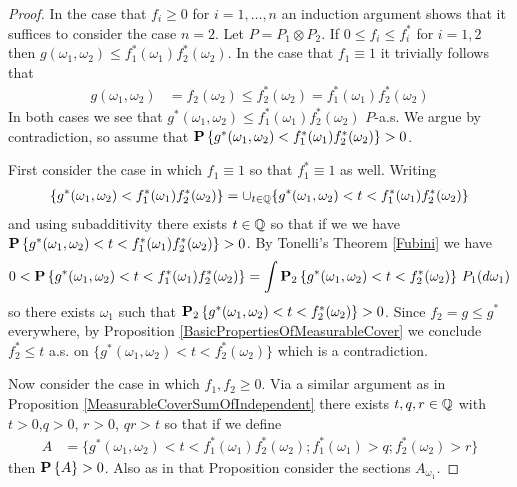 \begin{proof}
In the case that $f_i \geq 0$ for $i=1, \dotsc, n$  an induction argument shows that it suffices to consider the case $n=2$.  Let $P = P_1 \otimes P_2$.  If $0 \leq f_i \leq f_i^*$ for $i=1, 2$ then $g(\omega_1, \omega_2) \leq f_1^*(\omega_1) f_2^*(\omega_2)$.  In the case that $f_1 \equiv 1$ it trivially follows that 
\begin{align*}
g(\omega_1, \omega_2) &= f_2(\omega_2)  \leq  f_2^*(\omega_2) = f_1^*(\omega_1) f_2^*(\omega_2)
\end{align*}  
In both cases we see that $g^*(\omega_1,\omega_2) \leq f_1^*(\omega_1) f_2^*(\omega_2)$ $P$-a.s.  
We argue by contradiction, so assume that $\probability{g^*(\omega_1,\omega_2) < f_1^*(\omega_1) f_2^*(\omega_2)}>0$.

First consider the case in which $f_1 \equiv 1$ so that $f_1^* \equiv 1$ as well.  Writing
\begin{align*}
\lbrace g^*(\omega_1,\omega_2) < f_1^*(\omega_1) f_2^*(\omega_2)\rbrace =\cup_{t \in \rationals} \lbrace g^*(\omega_1,\omega_2) < t < f_1^*(\omega_1) f_2^*(\omega_2)\rbrace
\end{align*}
and using subadditivity there exists $t \in \rationals$ so that if we we have
$\probability{g^*(\omega_1,\omega_2) < t < f_1^*(\omega_1) f_2^*(\omega_2)} > 0$.  
 By Tonelli's Theorem \ref{Fubini} we
have
\begin{align*}
0 < \probability {g^*(\omega_1,\omega_2) < t < f_1^*(\omega_1) f_2^*(\omega_2)} = \int \sprobability{g^*(\omega_1,\omega_2) < t < f_2^*(\omega_2)}{2} \, P_1(d\omega_1)
\end{align*}
so there exists $\omega_1$ such that $\sprobability{g^*(\omega_1,\omega_2) < t < f_2^*(\omega_2)}{2}>0$.  
Since $f_2 = g \leq g^*$ everywhere, by Proposition \ref{BasicPropertiesOfMeasurableCover}  we conclude $f_2^* \leq t$ a.s. on $\lbrace g^*(\omega_1,\omega_2) < t < f_2^*(\omega_2) \rbrace$ which is a contradiction.

Now consider the case in which $f_1,f_2 \geq 0$.  Via a similar argument as in Proposition \ref{MeasurableCoverSumOfIndependent} there exists $t, q, r \in \rationals$ with $t>0$,$q>0$, $r>0$, $qr>t$ so that if we define 
\begin{align*}
A &= \lbrace g^*(\omega_1,\omega_2) < t < f_1^*(\omega_1) f_2^*(\omega_2); f_1^*(\omega_1) > q ; f_2^*(\omega_2) > r \rbrace
\end{align*}
then $\probability{A}>0$.  Also as in that Proposition consider the sections $A_{\omega_1}$. 


\end{proof}
